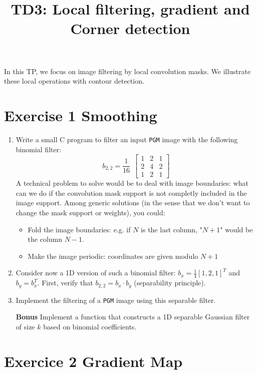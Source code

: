 \documentclass[a4paper, 11pt, french]{article}
\title{\bf{TD3: Local filtering, gradient and Corner detection}}
\author{}
\date{}
\begin{document}
\maketitle



In this TP, we focus on image filtering by local convolution masks. We illustrate these local operations with contour detection.


\section*{Exercise 1 \rm Smoothing}
\begin{enumerate}
	\item Write a small C program to filter an input \texttt{PGM} image with the following binomial filter:
	\[
		b_{2,2} = \frac{1}{16}~~
		\begin{bmatrix}
		1 & 2 &1 \\
		2 & 4 & 2\\
		1 & 2 & 1
		\end{bmatrix}
	\]
	A technical problem to solve would be to deal with image boundaries: what can we do if the convolution mask support is not completly included in the  image support. Among generic solutions (in the sense that we don't want to change the mask support or weights), you could:
	\begin{itemize}
		\item Fold the image boundaries: e.g. if $N$ is the last column, "$N+1$" would be the column $N-1$.
		\item Make the image periodic: coordinates are given modulo $N+1$
	\end{itemize}
	\item Consider now a 1D version of such a binomial filter: $b_x=\frac{1}{4}[1,2,1]^T$ and $b_y=b_x^T$. First, verify that $b_{2,2}=b_x\cdot b_y$ (separability principle).
	\item Implement the filtering of a \texttt{PGM} image using this separable filter.
	\item[\textbf{Bonus}] Implement a function that constructs a 1D separable Gaussian filter of size $k$ based on binomial coefficients.
\end{enumerate}



\section*{Exercice 2 \rm Gradient Map}
\end{document}
